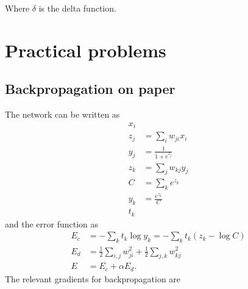 \documentclass[a4paper,11pt]{article}
\begin{document}
	\noindent Where $\delta$ is the delta function.

	\section{Practical problems}
	\subsection{Backpropagation on paper}
  The network can be written as
  \begin{align*}
    \tag{input layer}
      x_i\\
    \tag{hidden layer weighting}
      z_j&=\sum_iw_{ji}x_i\\
    \tag{hidden layer activation}
      y_j&=\frac{1}{1+e^{z_j}}\\
    \tag{output layer weighting}
      z_k&=\sum_jw_{kj}y_j\\
    \tag{output layer normalization}
      C&=\sum_ke^{z_k}\\
    \tag{output layer activation}
      y_k&=\frac{e^{z_k}}{C}\\
    \tag{output target}
      t_k
  \end{align*}
  and the error function as
  \begin{align*}
    \tag{classification error}
      E_c &= -\sum_kt_k\log y_k=-\sum_kt_k(z_k-\log C) \\
    \tag{weight decay error}
      E_d &= \frac{1}{2}\sum_{i,j}w_{ji}^2 + \frac{1}{2}\sum_{j,k}w_{kj}^2\\
    \tag{total error}
      E &= E_c + \alpha E_d.
  \end{align*}
  The relevant gradients for backpropagation are
\end{document}
